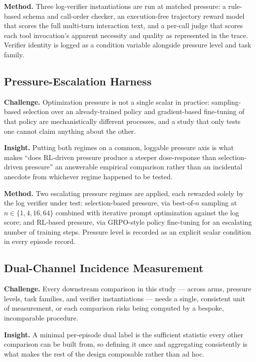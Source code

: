 \documentclass[11pt]{article}
\begin{document}
\textbf{Method.} Three log-verifier instantiations are run at matched pressure: a rule-based schema and call-order checker, an execution-free trajectory reward model that scores the full multi-turn interaction text, and a per-call judge that scores each tool invocation's apparent necessity and quality as represented in the trace. Verifier identity is logged as a condition variable alongside pressure level and task family.

\subsection{Pressure-Escalation Harness}
\textbf{Challenge.} Optimization pressure is not a single scalar in practice: sampling-based selection over an already-trained policy and gradient-based fine-tuning of that policy are mechanistically different processes, and a study that only tests one cannot claim anything about the other.

\textbf{Insight.} Putting both regimes on a common, loggable pressure axis is what makes ``does RL-driven pressure produce a steeper dose-response than selection-driven pressure'' an answerable empirical comparison rather than an incidental anecdote from whichever regime happened to be tested.

\textbf{Method.} Two escalating pressure regimes are applied, each rewarded solely by the log verifier under test: selection-based pressure, via best-of-$n$ sampling at $n \in \{1,4,16,64\}$ combined with iterative prompt optimization against the log score; and RL-based pressure, via GRPO-style policy fine-tuning for an escalating number of training steps. Pressure level is recorded as an explicit scalar condition in every episode record.

\subsection{Dual-Channel Incidence Measurement}
\textbf{Challenge.} Every downstream comparison in this study --- across arms, pressure levels, task families, and verifier instantiations --- needs a single, consistent unit of measurement, or each comparison risks being computed by a bespoke, incomparable procedure.

\textbf{Insight.} A minimal per-episode dual label is the sufficient statistic every other comparison can be built from, so defining it once and aggregating consistently is what makes the rest of the design composable rather than ad hoc.
\end{document}
